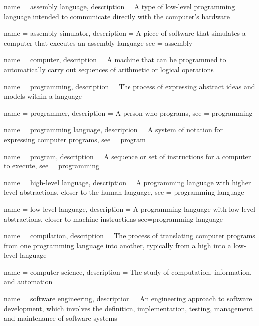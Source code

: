 \makeglossaries


 {
  name = {assembly language},
  description = {A type of low-level programming language intended to communicate directly with the computer's hardware}
}

 {
  name = {assembly simulator},
  description = {A piece of software that simulates a computer that executes an assembly language}
  see = {assembly}
}

 {
  name = {computer},
  description = {A machine that can be programmed to automatically carry out sequences of arithmetic or logical operations}
}

 {
  name = {programming},
  description = {The process of expressing abstract ideas and models within a language}
}

 {
  name = {programmer},
  description = {A person who programs},
  see = {programming}
}

 {
  name = {programming language},
  description = {A system of notation for expressing computer programs},
  see = {program}
}

 {
  name = {program},
  description = {A sequence or set of instructions for a computer to execute},
  see = {programming}
}

 {
  name = {high-level language},
  description = {A programming language with higher level abstractions, closer to the human language},
  see = {programming language}
}

 {
  name = {low-level language},
  description = {A programming language with low level abstractions, closer to machine instructions}
  see={programming language}
}

 {
  name = {compilation},
  description = {The process of translating computer programs from one programming language into another, typically from a high into a low-level language}
}

 {
  name = {computer science},
  description = {The study of computation, information, and automation}
}

 {
  name = {software engineering},
  description = {An engineering approach to software development, which involves the definition, implementation, testing, management and maintenance of software systems}
}

